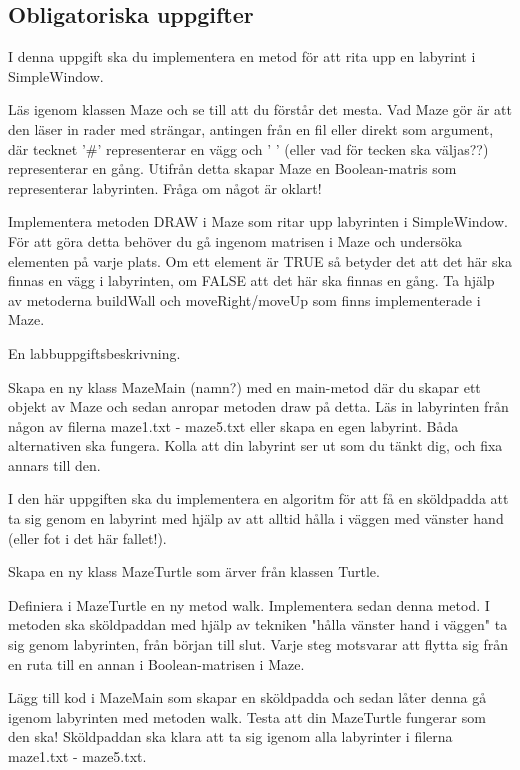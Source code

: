 \subsection{Obligatoriska uppgifter}

\Task I denna uppgift ska du implementera en metod för att rita upp en labyrint i SimpleWindow.

\Subtask Läs igenom klassen Maze och se till att du förstår det mesta. Vad Maze gör är att den läser in rader med strängar, antingen från en fil eller direkt som argument, där tecknet '\#' representerar en vägg och ' ' (eller vad för tecken ska väljas??) representerar en gång. Utifrån detta skapar Maze en Boolean-matris som representerar labyrinten. Fråga om något är oklart!

\Subtask Implementera metoden DRAW i Maze som ritar upp labyrinten i SimpleWindow. För att göra detta behöver du gå ingenom matrisen i Maze och undersöka elementen på varje plats. Om ett element är TRUE så betyder det att det här ska finnas en vägg i labyrinten, om FALSE att det här ska finnas en gång. Ta hjälp av metoderna buildWall och moveRight/moveUp som finns implementerade i Maze.

\Task En labbuppgiftsbeskrivning.

\Subtask Skapa en ny klass MazeMain (namn?) med en main-metod där du skapar ett objekt av Maze och sedan anropar metoden draw på detta. Läs in labyrinten från någon av filerna maze1.txt - maze5.txt eller skapa en egen labyrint. Båda alternativen ska fungera. Kolla att din labyrint ser ut som du tänkt dig, och fixa annars till den.

\Task I den här uppgiften ska du implementera en algoritm för att få en sköldpadda att ta sig genom en labyrint med hjälp av att alltid hålla i väggen med vänster hand (eller fot i det här fallet!).

\Subtask Skapa en ny klass MazeTurtle som ärver från klassen Turtle.

\Subtask Definiera i MazeTurtle en ny metod walk. Implementera sedan denna metod. I metoden ska sköldpaddan med hjälp av tekniken "hålla vänster hand i väggen" ta sig genom labyrinten, från början till slut. Varje steg motsvarar att flytta sig från en ruta till en annan i Boolean-matrisen i Maze.

\Subtask Lägg till kod i MazeMain som skapar en sköldpadda och sedan låter denna gå igenom labyrinten med metoden walk. Testa att din MazeTurtle fungerar som den ska! Sköldpaddan ska klara att ta sig igenom alla labyrinter i filerna maze1.txt - maze5.txt.

